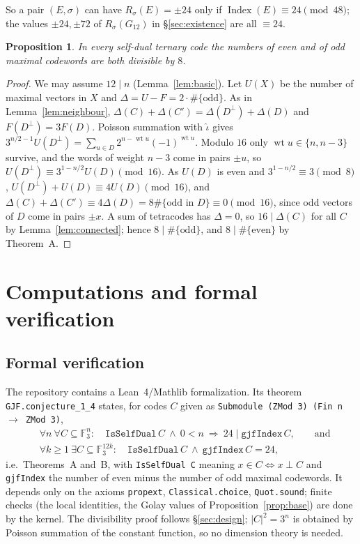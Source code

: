 \documentclass[11pt]{amsart}
\newtheorem{proposition}[theorem]{Proposition}
\theoremstyle{definition}
\newcommand{\F}{\mathbb{F}_3}
\newcommand{\wt}{\operatorname{wt}}
\newcommand{\Index}{\operatorname{Index}}
\begin{document}
So a pair $(E,\sigma)$ can have $R_\sigma(E)=\pm24$ only if $\Index(E)\equiv24\pmod{48}$; the values
$\pm24,\pm72$ of $R_\sigma(G_{12})$ in \S\ref{sec:existence} are all $\equiv24$.

\begin{proposition}\label{prop:eo8}
In every self-dual ternary code the numbers of even and of odd maximal codewords are both divisible
by $8$.
\end{proposition}

\begin{proof}
We may assume $12\mid n$ (Lemma~\ref{lem:basic}). Let $U(X)$ be the number of maximal vectors in $X$
and $\Delta=U-F=2\cdot\#\{\text{odd}\}$. As in
Lemma~\ref{lem:neighbour}, $\Delta(C)+\Delta(C')=\Delta(D^\perp)+\Delta(D)$ and $F(D^\perp)=3F(D)$.
Poisson summation with $\hat\iota$ gives $3^{n/2-1}U(D^\perp)=\sum_{u\in D}2^{n-\wt u}(-1)^{\wt u}$.
Modulo $16$ only $\wt u\in\{n,n-3\}$ survive, and the words of weight $n-3$ come in pairs $\pm u$, so
$U(D^\perp)\equiv3^{1-n/2}U(D)\pmod{16}$. As $U(D)$ is even and $3^{1-n/2}\equiv3\pmod8$,
$U(D^\perp)+U(D)\equiv4U(D)\pmod{16}$, and
$\Delta(C)+\Delta(C')\equiv4\Delta(D)=8\#\{\text{odd in }D\}\equiv0\pmod{16}$, since odd vectors of
$D$ come in pairs $\pm x$. A sum of tetracodes has $\Delta=0$, so $16\mid\Delta(C)$ for all $C$ by
Lemma~\ref{lem:connected}; hence $8\mid\#\{\text{odd}\}$, and $8\mid\#\{\text{even}\}$ by Theorem~A.
\end{proof}

\section{Computations and formal verification}\label{sec:verify}

\subsection*{Formal verification}
The repository \cite{repo} contains a Lean~4/Mathlib formalization. Its theorem
\texttt{GJF.conjecture\_1\_4} states, for codes $C$ given as \texttt{Submodule (ZMod 3) (Fin n $\to$ ZMod 3)},
\[
\begin{aligned}
  &\forall n\ \forall C\subseteq\F^n:\quad \mathtt{IsSelfDual}\,C\ \wedge\ 0<n\ \Longrightarrow\
    24\mid\mathtt{gjfIndex}\,C,\qquad\text{and}\\
  &\forall k\ge1\ \exists C\subseteq\F^{12k}:\quad \mathtt{IsSelfDual}\,C\ \wedge\
    \mathtt{gjfIndex}\,C=24,
\end{aligned}
\]
i.e.\ Theorems~A and~B, with \texttt{IsSelfDual C} meaning $x\in C\iff x\perp C$ and
\texttt{gjfIndex} the number of even minus the number of odd maximal codewords. It depends only on the
axioms \texttt{propext}, \texttt{Classical.choice}, \texttt{Quot.sound}; finite checks (the local
identities, the Golay values of Proposition~\ref{prop:base}) are done by the kernel. The divisibility
proof follows \S\ref{sec:design}; $|C|^2=3^n$ is obtained by Poisson summation of the constant
function, so no dimension theory is needed.
\end{document}
